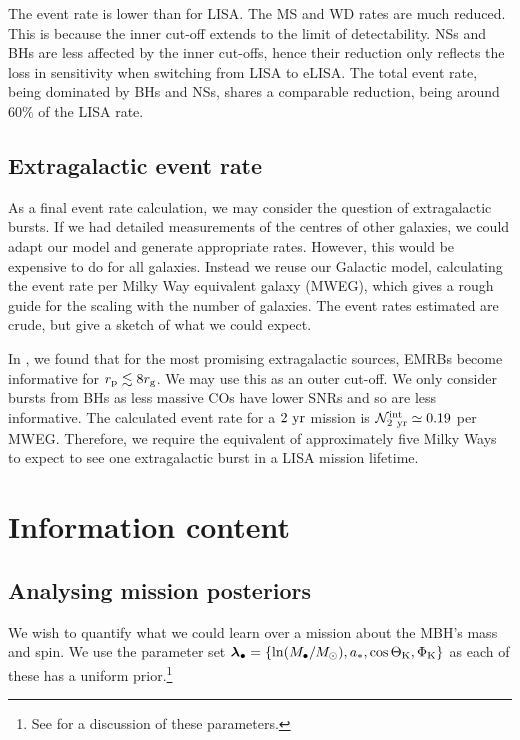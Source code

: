 The event rate is lower than for LISA. The MS and WD rates are much reduced. This is because the inner cut-off extends to the limit of detectability. NSs and BHs are less affected by the inner cut-offs, hence their reduction only reflects the loss in sensitivity when switching from LISA to eLISA. The total event rate, being dominated by BHs and NSs, shares a comparable reduction, being around $60\%$ of the LISA rate.

\subsection{Extragalactic event rate}\label{sec:extragal-events}

As a final event rate calculation, we may consider the question of extragalactic bursts. If we had detailed measurements of the centres of other galaxies, we could adapt our model and generate appropriate rates. However, this would be expensive to do for all galaxies. Instead we reuse our Galactic model, calculating the event rate per Milky Way equivalent galaxy (MWEG), which gives a rough guide for the scaling with the number of galaxies. The event rates estimated are crude, but give a sketch of what we could expect.

In , we found that for the most promising extragalactic sources, EMRBs become informative for $r_\mathrm{p} \lesssim 8 r_\mathrm{g}$. We may use this as an outer cut-off. We only consider bursts from BHs as less massive COs have lower SNRs and so are less informative. The calculated event rate for a $2~\mathrm{yr}$ mission is $\mathcal{N}_{2~\mathrm{yr}}^\mathrm{int} \simeq 0.19$ per MWEG. Therefore, we require the equivalent of approximately five Milky Ways to expect to see one extragalactic burst in a LISA mission lifetime.

\section{Information content}

\subsection{Analysing mission posteriors}

We wish to quantify what we could learn over a mission about the MBH's mass and spin. We use the parameter set $\boldsymbol{\lambda}_\bullet = \{\ln (M_\bullet/M_\odot), a_\ast, \cos \Theta_\mathrm{K}, \Phi_\mathrm{K}\}$ as each of these has a uniform prior.\footnote{See  for a discussion of these parameters.}

